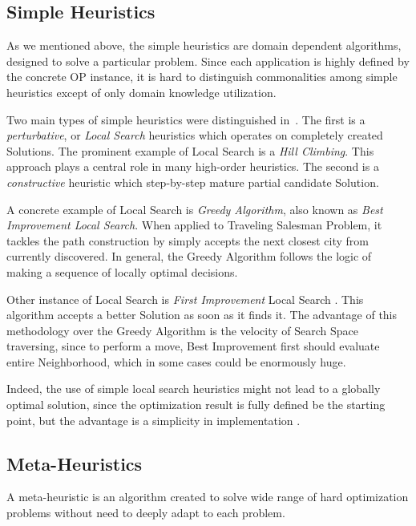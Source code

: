 \subsection{Simple Heuristics}
As we mentioned above, the simple heuristics are domain dependent algorithms, designed to solve a particular problem.
Since each application is highly defined by the concrete OP instance, it is hard to distinguish commonalities among simple heuristics except of only domain knowledge utilization.


Two main types of simple heuristics were distinguished in~\cite{burke2019classification}. The first is a \textit{perturbative}, or \textit{Local Search} heuristics which operates on completely created Solutions. The prominent example of Local Search is a \textit{Hill Climbing}. This approach plays a central role in many high-order heuristics. The second is a \textit{constructive} heuristic which step-by-step mature partial candidate Solution.

A concrete example of Local Search is \textit{Greedy Algorithm}, also known as \textit{Best Improvement Local Search}. When applied to Traveling Salesman Problem, it tackles the path construction by simply accepts the next closest city from currently discovered. In general, the Greedy Algorithm follows the logic of making a sequence of locally optimal decisions. 


Other instance of Local Search is \textit{First Improvement} Local Search \cite{voudouris1999guided}. This algorithm accepts a better Solution as soon as it finds it. The advantage of this methodology over the Greedy Algorithm is the velocity of Search Space traversing, since to perform a move, Best Improvement first should evaluate entire Neighborhood, which in some cases could be enormously huge.

Indeed, the use of simple local search heuristics might not lead to a globally optimal solution, since the optimization result is fully defined be the starting point, but the advantage is a simplicity in implementation \cite{williamson2011design}.

 


\subsection{Meta-Heuristics}
A meta-heuristic is an algorithm created to solve wide range of hard optimization problems without need to deeply adapt to each problem. 


